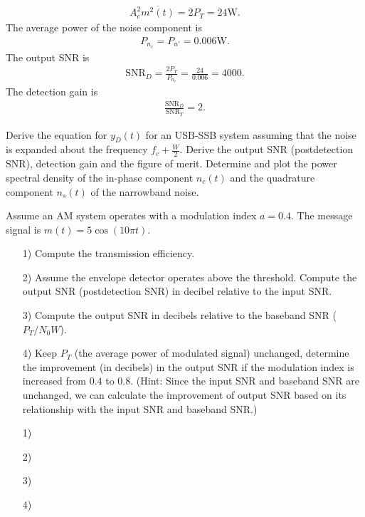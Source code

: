 \documentclass{assignment}
\begin{document}
\begin{sol}
\begin{align}
        A_c^2\overline{m^2(t)}=2P_T=24\mathrm{W}.
    \end{align}
    The average power of the noise component is
    \begin{align}
        P_{n_c}=P_{n'}=0.006\mathrm{W}.
    \end{align}
    The output SNR is
    \begin{align}
        \text{SNR}_D=\frac{2P_T}{P_{n_c}}=\frac{24}{0.006}=4000.
    \end{align}
    The detection gain is
    \begin{align}
        \frac{\text{SNR}_D}{\text{SNR}_T}=2.
    \end{align}
\end{sol}

\begin{prob}
    Derive the equation for $y_D(t)$ for an USB-SSB system assuming that the noise is expanded about the frequency $f_c+\frac{W}{2}$. Derive the output SNR (postdetection SNR), detection gain and the figure of merit. Determine and plot the power spectral density of the in-phase component $n_c(t)$ and the quadrature component $n_s(t)$ of the narrowband noise.
\end{prob}
\begin{sol}
    
\end{sol}

\begin{prob}
    Assume an AM system operates with a modulation index $a=0.4$. The message signal is $m(t)=5\cos(10\pi t)$.
    \begin{itemize}
        \item[1)] Compute the transmission efficiency.
        \item[2)] Assume the envelope detector operates above the threshold. Compute the output SNR (postdetection SNR) in decibel relative to the input SNR.
        \item[3)] Compute the output SNR in decibels relative to the baseband SNR ($P_T/N_0W$).
        \item[4)] Keep $P_T$ (the average power of modulated signal) unchanged, determine the improvement (in decibels) in the output SNR if the modulation index is increased from $0.4$ to $0.8$. (Hint: Since the input SNR and baseband SNR are unchanged, we can calculate the improvement of output SNR based on its relationship with the input SNR and baseband SNR.)
    \end{itemize}
\end{prob}
\begin{sol}
    \begin{itemize}
        \item[1)] 
        \item[2)] 
        \item[3)] 
        \item[4)] 
    \end{itemize}
\end{sol}
\end{document}
